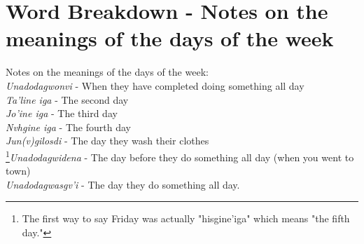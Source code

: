 \label{sec:daysOfWeekMeaning}\section{Word Breakdown - Notes on the meanings of the days of the week}Notes on the meanings of the days of the week:\\
\cite{walc1pp46}\textit{Unadodagwonvi} - When they have completed doing something all day\\
\textit{Ta’line iga} - The second day\\
\textit{Jo’ine iga} - The third day\\
\textit{Nvhgine iga} - The fourth day\\
\textit{Jun(v)gilosdi} - The day they wash their clothes\\
\footnote{The first way to say Friday was actually "hisgine'iga" which means "the fifth day."}\textit{Unadodagwidena} - The day before they do something all day (when you went to town)\\
\textit{Unadodagwasgv’i} - The day they do something all day.\\
